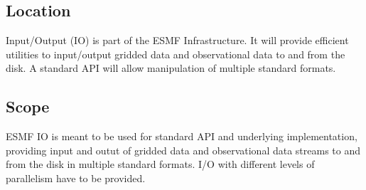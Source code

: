 \subsection{Location}

Input/Output (IO) is part of the ESMF Infrastructure.  It will provide
efficient utilities to input/output gridded data and observational data
to and from the disk. A standard API will allow manipulation of multiple
standard formats.


\subsection{Scope}

ESMF IO is meant to be used for standard API and underlying implementation, 
providing input and outut of gridded data and observational data streams to 
and from the disk in multiple standard formats. I/O with different levels of 
parallelism have to be provided.  





